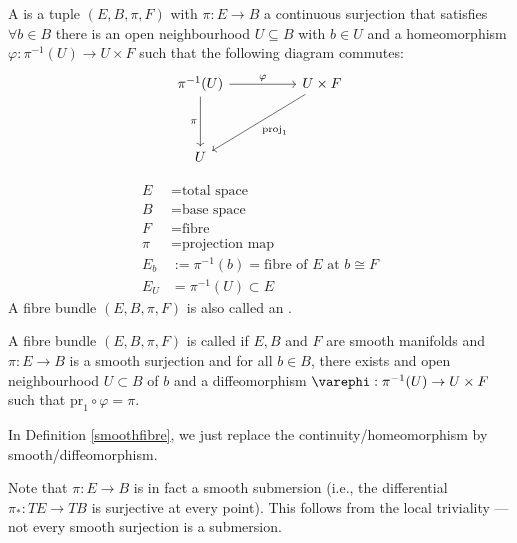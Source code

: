 \documentclass[main.tex]{subfiles}
\begin{document}
 A  is a tuple $(E, B, \pi, F)$ with $\pi: E \to B$ a continuous surjection that satisfies 
$\forall b \in B$ there is an open neighbourhood $U \subseteq B$ with $b \in U$ and a homeomorphism $\varphi: \pi^{-1}(U) \to U \times F$ such that the following diagram commutes:
\[
\begin{tikzcd}
 \pi^{-1}(U) \arrow[dd, "\pi"'] \arrow[rr, "\varphi"] &  & U \times F \arrow[lldd, "\text{proj}_1"] \\
                                                      &  &                                          \\
U                                                     &  &                                         
\end{tikzcd}
\]

\begin{notation}
\begin{align*}
    E &= \text{total space} \\
    B &= \text{base space} \\
    F &= \text{fibre} \\
    \pi &= \text{projection map} \\
    E_b &:= \pi^{-1}(b) = \text{fibre of $E$ at $b$} \cong F \\
    E_U &= \pi^{-1}(U) \subset E
\end{align*}
A fibre bundle $(E, B, \pi, F)$ is also called an .
\end{notation}

\begin{defn}\label{smoothfibre}
A fibre bundle $(E, B, \pi, F)$ is called  if $E, B$ and $F$ are smooth manifolds and $\pi : E \to B$ is a smooth surjection and for all $b \in B$, there exists and open neighbourhood $U \subset B$ of $b$ and a diffeomorphism $\varephi: \pi^{-1}(U) \to U \times F$ such that $\text{pr}_1 \circ \varphi = \pi$.
\end{defn}

\begin{note}
In Definition \ref{smoothfibre}, we just replace the continuity/homeomorphism by smooth/diffeomorphism.
\end{note}

\begin{rmk}
Note that $\pi: E \to B$ is in fact a smooth submersion (i.e., the differential $\pi_* : TE \to TB$ is surjective at every point). This follows from the local triviality --- not every smooth surjection is a submersion.
\end{rmk}
\end{document}
